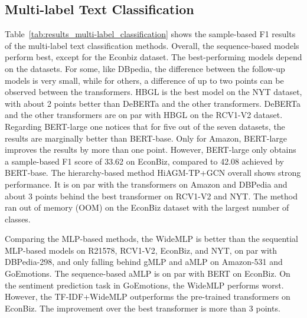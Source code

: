 \subsection{Multi-label Text Classification}

\renewcommand{\myheader}{
\caption{Results for the inductive multi-label text classification datasets. 
    We report the sample-based F1 metric to reflect how well the classifier performs on average per a set of new documents.
    An ``NA'' indicates that HiAGM could not be applied to the dataset since the classes are not hierarchically organized.
    ``OOM'' denotes that the model ran out of memory. 
    Standard deviation across runs is denoted in braces.}\label{tab:results_multi-label_classification}
}


\renewcommand{\myheader}{
    \caption{Mean accuracy and standard deviation (where available) across five runs for hierarchical multi-label classification on three common benchmark datasets using Micro-F1 and Macro-F1 scores.}\label{tab:results_multi-label_classification-extra}
}


Table~\ref{tab:results_multi-label_classification} shows the sample-based F1 results of the multi-label text classification methods.
Overall, the sequence-based models perform best, except for the Econbiz dataset. 
The best-performing models depend on the datasets.
For some, like DBpedia, the difference between the follow-up models is very small, while for others, a difference of up to two points can be observed between the transformers.
HBGL is the best model on the NYT dataset, with about 2 points better than DeBERTa and the other transformers.
DeBERTa and the other transformers are on par with HBGL on the RCV1-V2 dataset.
Regarding BERT-large one notices that for five out of the seven datasets, the results are marginally better than BERT-base.
Only for Amazon, BERT-large improves the results by more than one point.
However, BERT-large only obtains a sample-based F1 score of 33.62 on EconBiz, compared to 42.08 achieved by BERT-base.
The hierarchy-based method HiAGM-TP+GCN overall shows strong performance.
It is on par with the transformers on Amazon and DBPedia and about 3 points behind the best transformer on RCV1-V2 and NYT.
The method ran out of memory (OOM) on the EconBiz dataset with the largest number of classes.

Comparing the MLP-based methods, the WideMLP is better than the sequential MLP-based models on R21578, RCV1-V2, EconBiz, and NYT, on par with DBPedia-298, and only falling behind gMLP and aMLP on Amazon-531 and GoEmotions. 
The sequence-based aMLP is on par with BERT on EconBiz. 
On the sentiment prediction task in GoEmotions, the WideMLP performs worst. 
However, the TF-IDF+WideMLP outperforms the pre-trained transformers on EconBiz. 
The improvement over the best transformer is more than 3 points.

